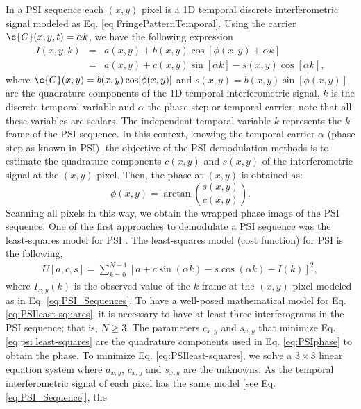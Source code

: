 In a PSI sequence each $(x,y)$ pixel is a 1D temporal discrete interferometric 
signal modeled as Eq. \eqref{eq:FringePatternTemporal}. Using the carrier 
$\c{C}(x,y,t)=\alpha k$, we have the following expression
\begin{eqnarray}
  I(x,y,k) &=& a(x,y) + b(x,y)\cos[\phi(x,y) +\alpha k] \nonumber \\
  &=& a(x,y) + c(x,y)\sin[\alpha k] - s(x,y)\cos[\alpha k],
  \label{eq:PSI_Sequence}
\end{eqnarray}
where $\c{C}(x,y)=b(x,y)\cos[\phi(x,y)]$ and
$s(x,y)=b(x,y)\sin[\phi(x,y)]$ are the quadrature components of the
1D temporal interferometric signal, $k$ is the discrete temporal
variable and $\alpha$ the phase step or temporal carrier; note that
all these variables are scalars. The independent temporal variable $k$
represents the $k$-frame of the PSI sequence. In this context, knowing
the temporal carrier $\alpha$ (phase step as known in PSI), the
objective of the PSI demodulation methods is to estimate the
quadrature components $c(x,y)$ and $s(x,y)$ of the interferometric
signal at the $(x,y)$ pixel. Then, the phase at $(x,y)$ is obtained as:
\begin{equation}
  \phi(x,y)=\arctan\left(\frac{s(x,y)}{c(x,y)}\right).
  \label{eq:PSIphase}
\end{equation}
Scanning all pixels in this way, we obtain the wrapped phase image of
the PSI sequence. One of the first approaches to demodulate a PSI
sequence was the least-squares model for PSI
\cite{Morgan,Greivenkamp,Okada,Kong}. The least-squares model (cost function) 
for PSI is the following,
\begin{align}\label{eq:PSIleast-squares}
  U[a,c,s]= \sum_{k=0}^{N-1}\left[a + c \sin(\alpha k)\right.
  -\left. s \cos(\alpha k)-I(k) \right]^2,
\end{align}
where $I_{x,y}(k)$ is the observed value of the $k$-frame at the
$(x,y)$ pixel modeled as in Eq. \eqref{eq:PSI_Sequences}. To have a
well-posed mathematical model for Eq. \eqref{eq:PSIleast-squares},
it is necessary to have at least three interferograms in the PSI sequence;
that is, $N\geq 3$. The parameters $c_{x,y}$ and $s_{x,y}$ that
minimize Eq. \eqref{eq:psi least-squares} are the quadrature
components used in Eq. \eqref{eq:PSIphase} to obtain the
phase. To minimize Eq. \eqref{eq:PSIleast-squares}, we solve a $3\times 3$
linear equation system where $a_{x,y}$, $c_{x,y}$ and
$s_{x,y}$ are the unknowns. As the temporal interferometric signal of
each pixel has the same model [see Eq. \eqref{eq:PSI_Sequence}], the
